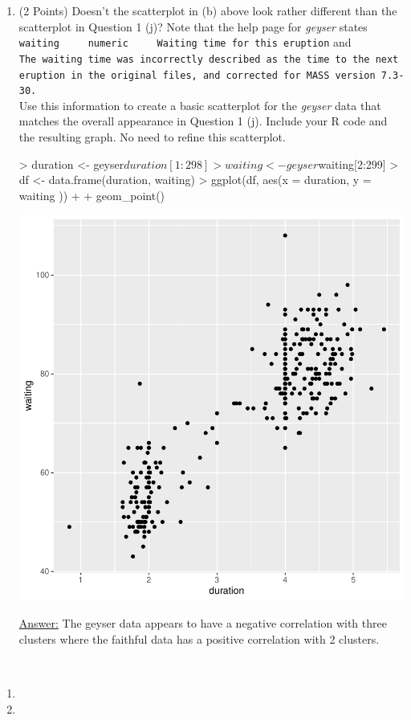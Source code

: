 \documentclass[12pt,letterpaper,final]{article}
\begin{document}
\begin{enumerate}
\begin{enumerate}
\newpage


\item (2 Points) Doesn't the scatterplot in (b) above look rather different 
than the scatterplot in Question 1 (j)? Note that the help page for {\it geyser}
states \verb|waiting	 numeric	 Waiting time for this eruption| and \\
\verb|The waiting time was incorrectly described as the time to the next|
\verb|eruption in the original files, and corrected for MASS version 7.3-30.| \\
Use this information to create a basic scatterplot 
for the {\it geyser} data that matches the overall 
appearance in Question 1 (j). 
Include your R code and the resulting graph.
No need to refine this scatterplot.

\begin{Schunk}
\begin{Sinput}
> duration <- geyser$duration[1:298]
> waiting <- geyser$waiting[2:299]
> df <- data.frame(duration, waiting)
> ggplot(df, aes(x = duration, y = waiting )) + 
+          geom_point()
\end{Sinput}
\end{Schunk}
\includegraphics{rnw_template-007}

\underline{Answer:} 
The geyser data appears to have a negative correlation with three clusters where the faithful data has a positive correlation with 2 clusters.


\end{enumerate}

\end{enumerate}


\newpage


~\\

\begin{enumerate}

\item <Instruction 1>

\item <Instruction 2>

\end{enumerate}
\end{document}
